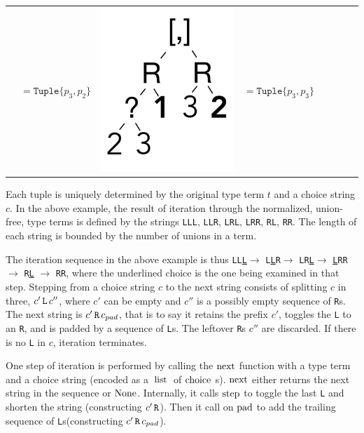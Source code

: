 \documentclass[a4paper,english]{lipics-v2019}
\newcommand{\xt}[1]{\texttt{#1}}
\renewcommand{\L}{{\tt L}\xspace}
\newcommand{\Ls}{{\tt L}s\xspace}
\newcommand{\R}{{\tt R}\xspace}
\newcommand{\uL}{{\underline{\tt L}}\xspace}
\renewcommand{\c}[1]{\ensuremath{\text{\lstinline{#1}}}\xspace}
\newcommand{\tuple}[1]{\xt{Tuple\{}#1\xt{\}}}
\begin{document}
{\begin{tabular}{@{}l@{~}ll@{~}ll@{~}ll@{~}l}
\begin{minipage}{1.2cm}
\end{minipage} &  $ =   \tuple{p_3,p_2} $ 
&\begin{minipage}{1.2cm}\includegraphics[scale=.25]{figures/tree7.pdf} 
\end{minipage} &  $ =   \tuple{p_3,p_3} $ 
\end{tabular}}

\medskip
\noindent 
Each tuple is uniquely determined by the original type term $t$ and a choice
string $c$. In the above example, the result of iteration through the
normalized, union-free, type terms is defined by the strings \L\L\L, \L\L\R,
\L\R\L, \L\R\R, \R\L, \R\R. The length of each string is bounded by the
number of unions in a term.


The iteration sequence in the above example is thus \L\L\uL $\rightarrow$
\L\uL\R $\rightarrow$ \L\R\uL $\rightarrow$ \uL\R\R $\rightarrow$ \R\uL
$\rightarrow$ \R\R, where the underlined choice is the one being examined in
that step. Stepping from a choice string $c$ to the next string consists of
splitting $c$ in three, $c' \,\L\,c''$, where $c'$ can be empty and $c''$ is a
possibly empty sequence of {\R}s.  The next string is $c'\, \R \, c_{pad}$,
that is to say it retains the prefix $c'$, toggles the \L to an \R, and is
padded by a sequence of \Ls. The leftover {\R}s $c''$ are discarded. If there is
no \L in $c$, iteration terminates.

One step of iteration is performed by calling the \c{next} function with a
type term and a choice string (encoded as a \c{list} of \c{choice}s). \c{next} either returns the next string in
the sequence or \c{None}. Internally, it calls \c{step} to toggle the
last \L and shorten the string (constructing $c'\,\R$). Then it call on
\c{pad} to add the trailing sequence of \Ls (constructing $c'\,\R\,c_{pad}$).
\end{document}
